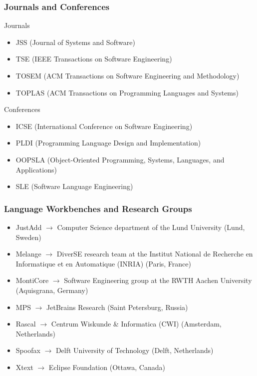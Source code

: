 \documentclass[9pt,xcolor=table,svgnames]{beamer}
\begin{document}
\begin{frame}
    \frametitle{Journals and Conferences}
    \alert{Journals}
    \begin{itemize}[itemsep=10pt]
        \item \normalsize JSS    \scriptsize (Journal of Systems and Software)
        \item \normalsize TSE    \scriptsize (IEEE Transactions on Software Engineering)
        \item \normalsize TOSEM  \scriptsize (ACM Transactions on Software Engineering and Methodology)
        \item \normalsize TOPLAS \scriptsize (ACM Transactions on Programming Languages and Systems)
    \end{itemize}

    \alert{Conferences}
    \begin{itemize}[itemsep=10pt]
        \item \normalsize ICSE   \scriptsize (International Conference on Software Engineering)
        \item \normalsize PLDI   \scriptsize (Programming Language Design and Implementation)
        \item \normalsize OOPSLA \scriptsize (Object-Oriented Programming, Systems, Languages, and Applications)
        \item \normalsize SLE    \scriptsize (Software Language Engineering)
    \end{itemize}
\end{frame}

\begin{frame}
    \frametitle{Language Workbenches and Research Groups}

    \begin{itemize}[itemsep=10pt]
        \item \normalsize JustAdd   $\rightarrow$ \scriptsize Computer Science department of the Lund University (Lund, Sweden)
        \item \normalsize Melange   $\rightarrow$ \scriptsize DiverSE research team at the Institut National de Recherche en Informatique et en Automatique (INRIA) (Paris, France)
        \item \normalsize MontiCore $\rightarrow$ \scriptsize Software Engineering group at the RWTH Aachen University (Aquisgrana, Germany)
        \item \normalsize MPS       $\rightarrow$ \scriptsize JetBrains Research (Saint Petersburg, Russia)
        \item \normalsize Rascal    $\rightarrow$ \scriptsize Centrum Wiskunde \& Informatica (CWI) (Amsterdam, Netherlands)
        \item \normalsize Spoofax   $\rightarrow$ \scriptsize Delft University of Technology (Delft, Netherlands)
        \item \normalsize Xtext     $\rightarrow$ \scriptsize Eclipse Foundation (Ottawa, Canada)
    \end{itemize}
\end{frame}
\end{document}
